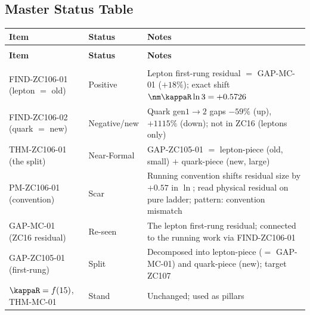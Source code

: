 \documentclass[12pt, a4paper]{article}
\begin{document}

\subsection{Master Status Table}
\label{sec:status-zc106}

{\small
\setlength{\LTpre}{4pt}\setlength{\LTpost}{4pt}
\renewcommand{\arraystretch}{1.30}
\begin{longtable}{>{\raggedright\arraybackslash}p{4.2cm}
                  >{\centering\arraybackslash}p{2.4cm}
                  >{\raggedright\arraybackslash}p{6.0cm}}
\toprule
\textbf{Item} & \textbf{Status} & \textbf{Notes} \\
\midrule
\endfirsthead
\multicolumn{3}{l}{\small\textit{(continued)}}\\[4pt]
\toprule\textbf{Item} & \textbf{Status} & \textbf{Notes}\\\midrule
\endhead
\midrule\multicolumn{3}{r}{\small\textit{(continues)}}\\
\endfoot
\bottomrule
\endlastfoot
FIND-ZC106-01 (lepton $=$ old) & Positive
  & Lepton first-rung residual $=$ GAP-MC-01 ($+18\%$); exact shift
    $\nm\kappaR\ln3=+0.5726$ \\[4pt]
FIND-ZC106-02 (quark $=$ new) & Negative/new
  & Quark gen$1{\to}2$ gaps $-59\%$ (up), $+1115\%$ (down); not in ZC16
    (leptons only) \\[4pt]
THM-ZC106-01 (the split) & Near-Formal
  & GAP-ZC105-01 $=$ lepton-piece (old, small) $+$ quark-piece (new, large) \\[4pt]
PM-ZC106-01 (convention) & Scar
  & Running convention shifts residual size by $+0.57$ in $\ln$; read physical
    residual on pure ladder; pattern: convention mismatch \\[4pt]
\midrule
GAP-MC-01 (ZC16 residual) & Re-seen
  & The lepton first-rung residual; connected to the running work via
    FIND-ZC106-01 \\[4pt]
GAP-ZC105-01 (first-rung) & Split
  & Decomposed into lepton-piece ($=$ GAP-MC-01) and quark-piece (new);
    target ZC107 \\[4pt]
$\kappaR=f(15)$, THM-MC-01 & Stand
  & Unchanged; used as pillars \\
\end{longtable}
}
\end{document}
